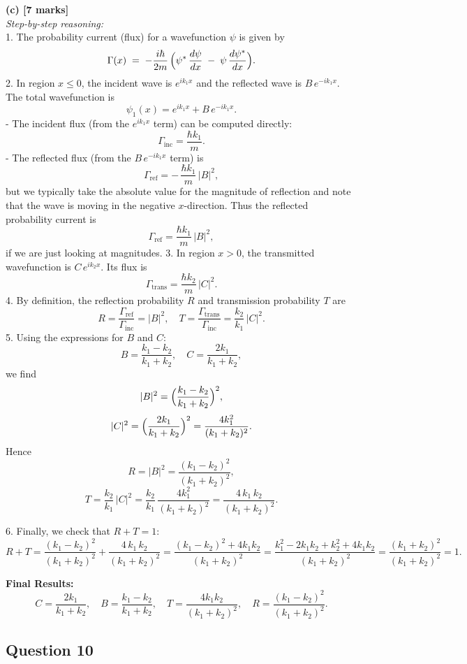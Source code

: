\documentclass{article}
\begin{document}
\textbf{(c) [7 marks]}\\
\textit{Step-by-step reasoning:}\\
1. The probability current (flux) for a wavefunction \(\psi\) is given by
\[
\Gamma(x) \;=\; -\frac{i\hbar}{2m}\,\Bigl(\psi^*\,\frac{d\psi}{dx} \;-\; \psi\,\frac{d\psi^*}{dx}\Bigr).
\]
2. In region \( x \leq 0 \), the incident wave is \( e^{i k_1 x} \) and the reflected wave is \( B\,e^{-i k_1 x} \). The total wavefunction is
\[
\psi_1(x) = e^{i k_1 x} + B\,e^{-i k_1 x}.
\]
   - The incident flux (from the \( e^{i k_1 x} \) term) can be computed directly:
     \[
     \Gamma_{\mathrm{inc}} = \frac{\hbar k_1}{m}.
     \]
   - The reflected flux (from the \( B\,e^{-i k_1 x} \) term) is
     \[
     \Gamma_{\mathrm{ref}} = -\,\frac{\hbar k_1}{m}\,|B|^2,
     \]
     but we typically take the absolute value for the magnitude of reflection and note that the wave is moving in the negative \(x\)-direction. Thus the reflected probability current is
     \[
     \Gamma_{\mathrm{ref}} = \frac{\hbar k_1}{m}\,|B|^2,
     \]
     if we are just looking at magnitudes.
3. In region \( x > 0 \), the transmitted wavefunction is \( C \, e^{i k_2 x} \). Its flux is
\[
\Gamma_{\mathrm{trans}} = \frac{\hbar k_2}{m}\,|C|^2.
\]
4. By definition, the reflection probability \(R\) and transmission probability \(T\) are
\[
R = \frac{\Gamma_{\mathrm{ref}}}{\Gamma_{\mathrm{inc}}} = |B|^2, 
\quad
T = \frac{\Gamma_{\mathrm{trans}}}{\Gamma_{\mathrm{inc}}} = \frac{k_2}{k_1}\,|C|^2.
\]
5. Using the expressions for \( B \) and \( C \):
\[
B = \frac{k_1 - k_2}{k_1 + k_2},
\quad
C = \frac{2k_1}{k_1 + k_2},
\]
we find
\[
|B|^2 = \Bigl(\frac{k_1 - k_2}{k_1 + k_2}\Bigr)^2,
\]
\[
|C|^2 = \Bigl(\frac{2k_1}{k_1 + k_2}\Bigr)^2 = \frac{4k_1^2}{(k_1 + k_2)^2}.
\]
Hence
\[
R = |B|^2 = \frac{(k_1 - k_2)^2}{(k_1 + k_2)^2},
\]
\[
T = \frac{k_2}{k_1}\,|C|^2 = \frac{k_2}{k_1}\,\frac{4k_1^2}{(k_1 + k_2)^2}
= \frac{4\,k_1\,k_2}{(k_1 + k_2)^2}.
\]

6. Finally, we check that \( R + T = 1 \):
\[
R + T = \frac{(k_1 - k_2)^2}{(k_1 + k_2)^2} + \frac{4\,k_1\,k_2}{(k_1 + k_2)^2}
= \frac{(k_1 - k_2)^2 + 4k_1 k_2}{(k_1 + k_2)^2}
= \frac{k_1^2 - 2k_1 k_2 + k_2^2 + 4k_1 k_2}{(k_1 + k_2)^2}
= \frac{(k_1 + k_2)^2}{(k_1 + k_2)^2} = 1.
\]

\textbf{Final Results:}\\
\[
C = \frac{2k_1}{k_1 + k_2}, 
\quad
B = \frac{k_1 - k_2}{k_1 + k_2},
\quad
T = \frac{4k_1k_2}{(k_1 + k_2)^2},
\quad
R = \frac{(k_1 - k_2)^2}{(k_1 + k_2)^2}.
\]


\subsection{Question 10}
\end{document}
